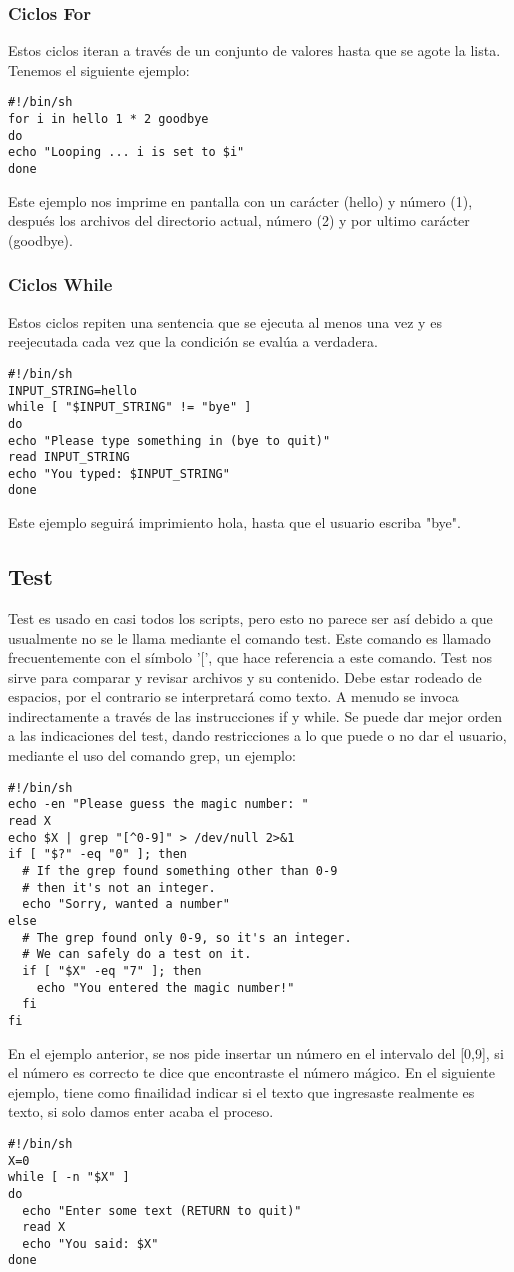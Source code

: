 \documentclass{article}
\begin{document}
\begin{itemize}
\subsubsection*{Ciclos For}
Estos ciclos iteran a través de un conjunto de valores hasta que se agote la lista. Tenemos el siguiente ejemplo:
\begin{verbatim}
#!/bin/sh
for i in hello 1 * 2 goodbye
do
echo "Looping ... i is set to $i"
done
\end{verbatim}
Este ejemplo nos imprime en pantalla con un carácter (hello) y número (1), después los archivos del directorio actual, número (2) y por ultimo carácter (goodbye).

\subsubsection*{Ciclos While}
Estos ciclos repiten una sentencia que se ejecuta al menos una vez y es reejecutada cada vez que la condición se evalúa a verdadera.
\begin{verbatim}
#!/bin/sh
INPUT_STRING=hello
while [ "$INPUT_STRING" != "bye" ]
do
echo "Please type something in (bye to quit)"
read INPUT_STRING
echo "You typed: $INPUT_STRING"
done
\end{verbatim}
Este ejemplo seguirá imprimiento hola, hasta que el usuario escriba "bye".

\subsection*{Test}
Test es usado en casi todos los scripts, pero esto no parece ser así debido a que usualmente no se le llama mediante el comando test. Este comando es llamado frecuentemente con el símbolo ’[’, que hace referencia a este comando. Test nos sirve para comparar y revisar archivos y su contenido. Debe estar rodeado de espacios, por el contrario se interpretará como texto. A menudo se invoca indirectamente a través de las instrucciones if y while. Se puede dar mejor orden a las indicaciones del test, dando restricciones a lo que puede
o no dar el usuario, mediante el uso del comando grep, un ejemplo:
\begin{verbatim}
#!/bin/sh
echo -en "Please guess the magic number: "
read X
echo $X | grep "[^0-9]" > /dev/null 2>&1
if [ "$?" -eq "0" ]; then
  # If the grep found something other than 0-9
  # then it's not an integer.
  echo "Sorry, wanted a number"
else
  # The grep found only 0-9, so it's an integer.
  # We can safely do a test on it.
  if [ "$X" -eq "7" ]; then
    echo "You entered the magic number!"
  fi
fi
\end{verbatim}
En el ejemplo anterior, se nos pide insertar un número en el intervalo del [0,9], si el número es correcto te dice que encontraste el número mágico. En el siguiente ejemplo, tiene como finailidad indicar si el texto que ingresaste realmente es texto, si solo damos enter acaba el proceso.
\begin{verbatim}
#!/bin/sh
X=0
while [ -n "$X" ]
do
  echo "Enter some text (RETURN to quit)"
  read X
  echo "You said: $X"
done
\end{verbatim}

\end{itemize}
\end{document}
